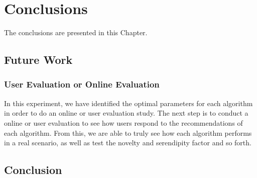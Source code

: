\chapter{Conclusions}\label{C:con}
The conclusions are presented in this Chapter.


\section{Future Work}

\subsection{User Evaluation or Online Evaluation}
In this experiment, we have identified the optimal parameters for each algorithm in order to do an online or user evaluation study. The next step is to conduct a online or user evaluation to see how users respond to the recommendations of each algorithm. From this, we are able to truly see how each algorithm performs in a real scenario, as well as test the novelty and serendipity factor and so forth. 


\section{Conclusion}